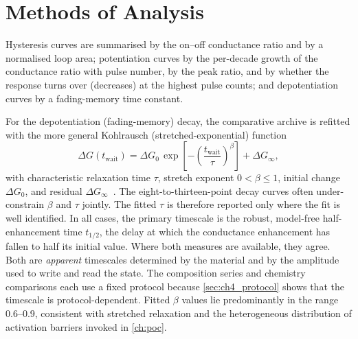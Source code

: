 \documentclass[12pt, twoside]{report}
\begin{document}
\section{Methods of Analysis}\label{sec:ch4_methods}

Hysteresis curves are summarised by the on--off conductance ratio and by a normalised loop area; potentiation curves by the per-decade growth of the conductance ratio with pulse number, by the peak ratio, and by whether the response turns over (decreases) at the highest pulse counts; and depotentiation curves by a fading-memory time constant.

For the depotentiation (fading-memory) decay, the comparative archive is refitted with the more general Kohlrausch (stretched-exponential) function
\begin{equation}
  \label{eq:ch4_kohlrausch}
  \Delta G(t_{\mathrm{wait}}) = \Delta G_0\,\exp\!\left[-\left(\frac{t_{\mathrm{wait}}}{\tau}\right)^{\beta}\right] + \Delta G_\infty,
\end{equation}
with characteristic relaxation time \(\tau\), stretch exponent \(0 < \beta \le 1\), initial change \(\Delta G_0\), and residual \(\Delta G_\infty\)~\cite{Sturman2003}. The eight-to-thirteen-point decay curves often under-constrain \(\beta\) and \(\tau\) jointly. The fitted \(\tau\) is therefore reported only where the fit is well identified. In all cases, the primary timescale is the robust, model-free half-enhancement time \(t_{1/2}\), the delay at which the conductance enhancement has fallen to half its initial value. Where both measures are available, they agree. Both are \emph{apparent} timescales determined by the material and by the amplitude used to write and read the state. The composition series and chemistry comparisons each use a fixed protocol because \cref{sec:ch4_protocol} shows that the timescale is protocol-dependent. Fitted \(\beta\) values lie predominantly in the range \numrange{0.6}{0.9}, consistent with stretched relaxation and the heterogeneous distribution of activation barriers invoked in \cref{ch:poc}.
\end{document}
